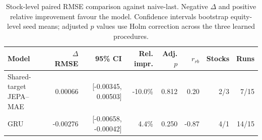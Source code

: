 \begin{table}[t]
\centering
\small
\caption{Stock-level paired RMSE comparison against naive-last. Negative $\Delta$ and positive relative improvement favour the model. Confidence intervals bootstrap equity-level seed means; adjusted $p$ values use Holm correction across the three learned procedures.}
\label{tab:paired_rmse_naive}
\begin{tabular}{lrrrrrrr}
\toprule
Model & $\Delta$RMSE & 95\% CI & Rel. impr. & Adj. $p$ & $r_{rb}$ & Stocks & Runs \\
\midrule
Shared-target JEPA--MAE & 0.00066 & [-0.00345, 0.00503] & -10.0\% & 0.812 & 0.20 & 2/3 & 7/15 \\
GRU & -0.00276 & [-0.00658, -0.00042] & 4.4\% & 0.250 & -0.87 & 4/1 & 14/15 \\
\bottomrule
\end{tabular}
\end{table}
